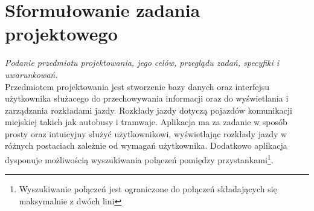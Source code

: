 \section{Sformułowanie zadania projektowego}

\textit{Podanie przedmiotu projektowania, jego celów,
przeglądu zadań, specyfiki i uwarunkowań.} \\

Przedmiotem projektowania jest stworzenie bazy danych oraz interfejsu użytkownika służacego do przechowywania informacji oraz do wyświetlania i zarządzania rozkładami jazdy. Rozkłady jazdy dotyczą pojazdów komunikacji miejskiej takich jak autobusy i tramwaje.
Aplikacja ma za zadanie w sposób prosty oraz intuicyjny służyć użytkownikowi, wyświetlając rozkłady jazdy w różnych postaciach zależnie od wymagań użytkownika. Dodatkowo aplikacja dysponuje możliwością wyszukiwania połączeń pomiędzy przystankami\footnote{Wyszukiwanie połączeń jest ograniczone do połączeń składających się maksymalnie z dwóch lini}.
